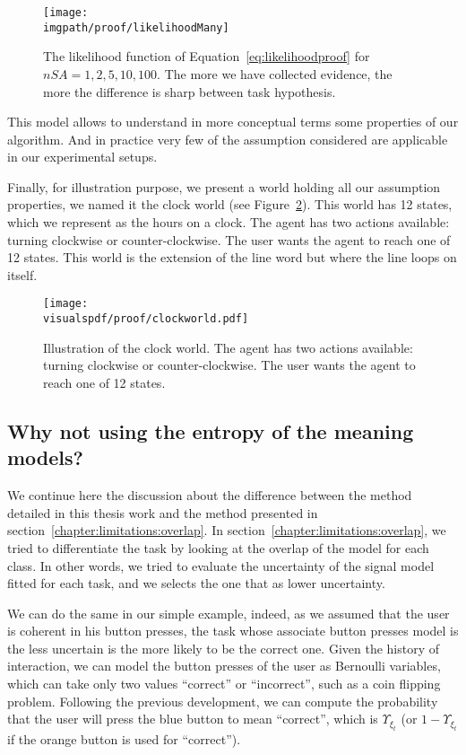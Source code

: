 \begin{figure}[!htbp]
\centering
\texttt{[image: \\imgpath/proof/likelihoodMany]}
\caption{The likelihood function of Equation~\ref{eq:likelihoodproof} for $nSA =1,2,5,10,100$. The more we have collected evidence, the more the difference is sharp between task hypothesis.}
\label{fig:prooflikelihoodmany}
\end{figure}

This model allows to understand in more conceptual terms some properties of our algorithm. And in practice very few of the assumption considered are applicable in our experimental setups.

Finally, for illustration purpose, we present a world holding all our assumption properties, we named it the clock world (see Figure~\ref{fig:clockworld}). This world has 12 states, which we represent as the hours on a clock. The agent has two actions available: turning clockwise or counter-clockwise. The user wants the agent to reach one of 12 states. This world is the extension of the line word but where the line loops on itself.

\begin{figure}[!htbp]
\centering
\texttt{[image: \\visualspdf/proof/clockworld.pdf]}
\caption{Illustration of the clock world. The agent has two actions available: turning clockwise or counter-clockwise. The user wants the agent to reach one of 12 states.}
\label{fig:clockworld}
\end{figure} 

\subsection{Why not using the entropy of the meaning models?}

We continue here the discussion about the difference between the method detailed in this thesis work and the method presented in section~\ref{chapter:limitations:overlap}. In section~\ref{chapter:limitations:overlap}, we tried to differentiate the task by looking at the overlap of the model for each class. In other words, we tried to evaluate the uncertainty of the signal model fitted for each task, and we selects the one that as lower uncertainty.

We can do the same in our simple example, indeed, as we assumed that the user is coherent in his button presses, the task whose associate button presses model is the less uncertain is the more likely to be the correct one. Given the history of interaction, we can model the button presses of the user as Bernoulli variables, which can take only two values ``correct'' or ``incorrect'', such as a coin flipping problem. Following the previous development, we can compute the probability that the user will press the blue button to mean ``correct'', which is $\Upsilon_{\xi_t}$ (or $1-\Upsilon_{\xi_t}$ if the orange button is used for ``correct'').

